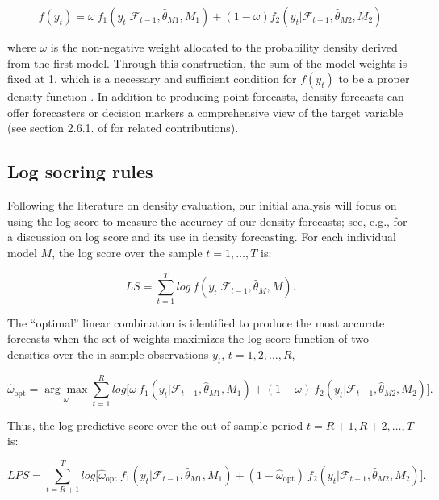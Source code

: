 \documentclass{monashthesis}
\begin{document}
\begin{equation}
\label{eqn:LC1}
f(y_t) = \omega \ f_1(y_t | \mathcal{F}_{t-1}, \hat\theta_{M1}, M_1) + (1-\omega) f_2(y_t | \mathcal{F}_{t-1}, \hat\theta_{M2}, M_2)
\end{equation}

where \(\omega\) is the non-negative weight allocated to the probability density derived from the first model. Through this construction, the sum of the model weights is fixed at 1, which is a necessary and sufficient condition for \(f(y_t)\) to be a proper density function \autocite{GA11}. In addition to producing point forecasts, density forecasts can offer forecasters or decision markers a comprehensive view of the target variable (see section 2.6.1. of \textcite{FTP22} for related contributions).

\hypertarget{log-socring-rules}{%
\subsection{Log socring rules}\label{log-socring-rules}}

Following the literature on density evaluation, our initial analysis will focus on using the log score to measure the accuracy of our density forecasts; see, e.g., \textcite{GA11} for a discussion on log score and its use in density forecasting. For each individual model \(M\), the log score over the sample \(t = 1, \dots, T\) is:

\begin{equation}
\label{eqn:LS1}
LS = \sum^T_{t=1} log \ f(y_t| \mathcal{F}_{t-1}, \hat\theta_M, M).
\end{equation}

The ``optimal'' linear combination is identified to produce the most accurate forecasts when the set of weights maximizes the log score function of two densities over the in-sample observations \(y_t\), \(t = 1, 2, \dots, R\),

\begin{equation}
\label{eqn:LS2}
\hat{\omega}_{\text{opt}} = \underset{\omega}{\arg\max} \sum^R_{t=1} log \Big[ \omega \ f_1(y_t| \mathcal{F}_{t-1}, \hat\theta_{M1}, M_1) + (1-\omega) \ f_2(y_t| \mathcal{F}_{t-1}, \hat\theta_{M2}, M_2)\Big].
\end{equation}

Thus, the log predictive score over the out-of-sample period \(t = R+1, R+2, \dots, T\) is:

\begin{equation}
\label{eqn:LS3}
LPS = \sum^T_{t = R+1} log \Big[ \hat{\omega}_{\text{opt}} \ f_1(y_t| \mathcal{F}_{t-1}, \hat\theta_{M1}, M_1) + (1- \hat{\omega}_{\text{opt}}) \ f_2(y_t| \mathcal{F}_{t-1}, \hat\theta_{M2}, M_2)\Big].
\end{equation}
\end{document}
